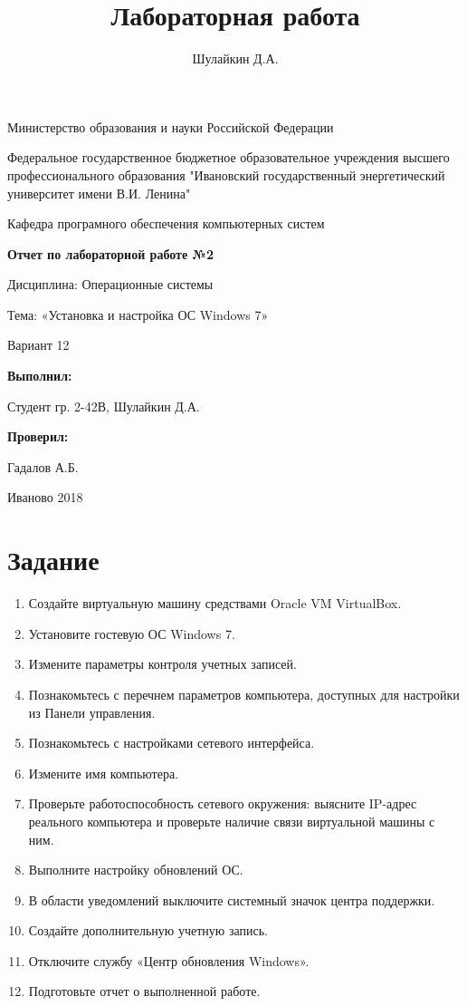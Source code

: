 \documentclass[a4paper]{article}
\title{Лабораторная работа}
\author{Шулайкин Д.А.}
\begin{document}
\onehalfspacing
\thispagestyle{empty}
\begin{center}
Министерство образования и науки Российской Федерации
\vspace{10pt}

Федеральное государственное бюджетное образовательное учреждения высшего профессионального образования "Ивановский государственный энергетический университет имени В.И. Ленина"
\vspace{40pt}

Кафедра програмного обеспечения компьютерных систем
\vspace{40pt}

\textbf{Отчет по лабораторной работе №2}

Дисциплина: Операционные системы

Тема: «Установка и настройка ОС Windows 7»

Вариант 12
\end{center}

\vspace{330pt}
\begin{flushright}
\textbf{Выполнил:}

Студент гр. 2-42В, Шулайкин Д.А.

\textbf{Проверил:}

Гадалов А.Б.
\end{flushright}
\vspace{40pt}
\begin{center}
Иваново 2018
\end{center}
\pagebreak

\section{Задание}
\begin{enumerate}
    \item Создайте виртуальную машину средствами Oracle VM VirtualBox. 
    \item Установите гостевую ОС Windows 7. 
    \item Измените параметры контроля учетных записей. 
    \item Познакомьтесь с перечнем параметров компьютера, доступных для настройки из Панели управления.
    \item Познакомьтесь с настройками сетевого интерфейса. 
    \item Измените имя компьютера. 
    \item Проверьте работоспособность сетевого окружения: выясните IP-адрес реального компьютера и проверьте наличие связи виртуальной машины с ним. 
    \item Выполните настройку обновлений ОС. 
    \item В области уведомлений выключите системный значок центра поддержки. 
    \item Создайте дополнительную учетную запись. 
    \item Отключите службу «Центр обновления Windows». 
    \item Подготовьте отчет о выполненной работе.
\end{enumerate}
\end{document}

